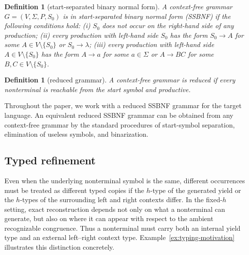 \documentclass[11pt,a4paper]{article}
\newtheorem{definition}[theorem]{Definition}
\begin{document}
\begin{definition}[start-separated binary normal form]\label{def:SSBNF}
A context-free grammar $G=(V,\Sigma,P,S_0)$ is in
\emph{start-separated binary normal form} (SSBNF) if the following
conditions hold: \textup{(i)} $S_0$ does not occur on the right-hand
side of any production; \textup{(ii)} every production with left-hand
side $S_0$ has the form $S_0\to A$ for some
$A\in V\setminus\{S_0\}$ or $S_0\to\lambda$; \textup{(iii)} every
production with left-hand side $A\in V\setminus\{S_0\}$ has the form
$A\to a$ for some $a\in\Sigma$ or $A\to BC$ for some
$B,C\in V\setminus\{S_0\}$.
\end{definition}

\begin{definition}[reduced grammar]\label{def:reduced}
A context-free grammar is \emph{reduced} if every nonterminal is
reachable from the start symbol and productive.
\end{definition}

Throughout the paper, we work with a reduced SSBNF grammar for the
target language. An equivalent reduced SSBNF grammar can be obtained
from any context-free grammar by the standard procedures of
start-symbol separation, elimination of useless symbols, and
binarization.

\subsection{Typed refinement}\label{subsec:typed-refinement}

Even when the underlying nonterminal symbol is the same, different
occurrences must be treated as different typed copies if the $h$-type of
the generated yield or the $h$-types of the surrounding left and right
contexts differ. In the fixed-$h$ setting, exact reconstruction depends
not only on what a nonterminal can generate, but also on where it can
appear with respect to the ambient recognizable congruence. Thus a
nonterminal must carry both an internal yield type and an external
left--right context type. Example~\ref{ex:typing-motivation} illustrates
this distinction concretely.
\end{document}
